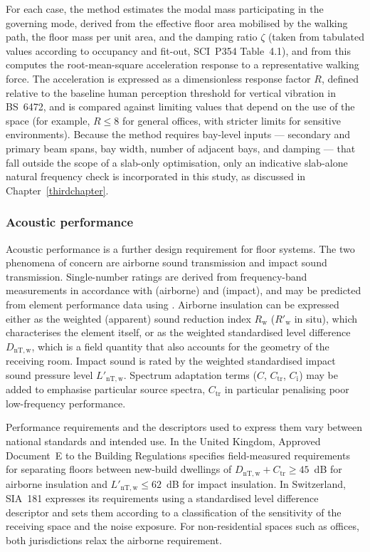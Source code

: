 For each case, the method estimates the modal mass participating in the governing mode, derived from the effective floor area mobilised by the walking path, the floor mass per unit area, and the damping ratio $\zeta$ (taken from tabulated values according to occupancy and fit-out, SCI~P354 Table~4.1), and from this computes the root-mean-square acceleration response to a representative walking force. The acceleration is expressed as a dimensionless response factor $R$, defined relative to the baseline human perception threshold for vertical vibration in BS~6472, and is compared against limiting values that depend on the use of the space (for example, $R \le 8$ for general offices, with stricter limits for sensitive environments). Because the method requires bay-level inputs --- secondary and primary beam spans, bay width, number of adjacent bays, and damping --- that fall outside the scope of a slab-only optimisation, only an indicative slab-alone natural frequency check is incorporated in this study, as discussed in Chapter~\ref{thirdchapter}.

\subsubsection*{Acoustic performance}
Acoustic performance is a further design requirement for floor systems. The two phenomena of concern are airborne sound transmission and impact sound transmission. Single-number ratings are derived from frequency-band measurements in accordance with \citet{RefWorks:isoEN7171} (airborne) and \citet{RefWorks:isoEN7172} (impact), and may be predicted from element performance data using \citet{RefWorks:en12354}. Airborne insulation can be expressed either as the weighted (apparent) sound reduction index $R_\mathrm{w}$ ($R'_\mathrm{w}$ in situ), which characterises the element itself, or as the weighted standardised level difference $D_\mathrm{nT,w}$, which is a field quantity that also accounts for the geometry of the receiving room. Impact sound is rated by the weighted standardised impact sound pressure level $L'_\mathrm{nT,w}$. Spectrum adaptation terms ($C$, $C_\mathrm{tr}$, $C_\mathrm{i}$) may be added to emphasise particular source spectra, $C_\mathrm{tr}$ in particular penalising poor low-frequency performance.

Performance requirements and the descriptors used to express them vary between national standards and intended use. In the United Kingdom, Approved Document~E to the Building Regulations \citep{RefWorks:adePartE} specifies field-measured requirements for separating floors between new-build dwellings of $D_\mathrm{nT,w} + C_\mathrm{tr} \geq 45$~dB for airborne insulation and $L'_\mathrm{nT,w} \leq 62$~dB for impact insulation. In Switzerland, SIA~181 \citep{RefWorks:sia181} expresses its requirements using a standardised level difference descriptor and sets them according to a classification of the sensitivity of the receiving space and the noise exposure. For non-residential spaces such as offices, both jurisdictions relax the airborne requirement.

